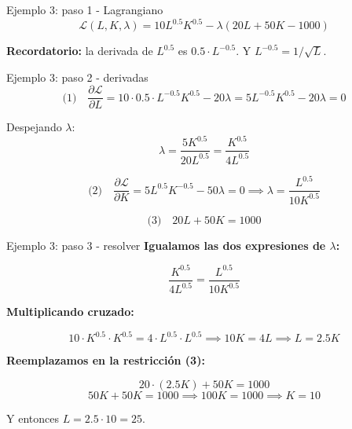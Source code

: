 \documentclass{beamer}
\begin{document}
\begin{frame}{Ejemplo 3: paso 1 - Lagrangiano}
    \small
    \[
    \mathcal{L}(L, K, \lambda) = 10 L^{0.5} K^{0.5} - \lambda(20L + 50K - 1000)
    \]

    \vspace{1em}

    \textbf{Recordatorio:} la derivada de $L^{0.5}$ es $0.5 \cdot L^{-0.5}$. Y $L^{-0.5} = 1/\sqrt{L}$.
\end{frame}

\begin{frame}{Ejemplo 3: paso 2 - derivadas}
    \small
    \[
    \text{(1)} \quad \frac{\partial \mathcal{L}}{\partial L} = 10 \cdot 0.5 \cdot L^{-0.5} K^{0.5} - 20\lambda = 5 L^{-0.5} K^{0.5} - 20\lambda = 0
    \]

    \vspace{0.3em}

    Despejando $\lambda$:
    \[
    \lambda = \frac{5 K^{0.5}}{20 L^{0.5}} = \frac{K^{0.5}}{4 L^{0.5}}
    \]

    \vspace{0.8em}

    \[
    \text{(2)} \quad \frac{\partial \mathcal{L}}{\partial K} = 5 L^{0.5} K^{-0.5} - 50\lambda = 0 \implies \lambda = \frac{L^{0.5}}{10 K^{0.5}}
    \]

    \[
    \text{(3)} \quad 20L + 50K = 1000
    \]
\end{frame}

\begin{frame}{Ejemplo 3: paso 3 - resolver}
    \small
    \textbf{Igualamos las dos expresiones de $\lambda$:}

    \[
    \frac{K^{0.5}}{4 L^{0.5}} = \frac{L^{0.5}}{10 K^{0.5}}
    \]

    \vspace{0.3em}

    \textbf{Multiplicando cruzado:}

    \[
    10 \cdot K^{0.5} \cdot K^{0.5} = 4 \cdot L^{0.5} \cdot L^{0.5} \implies 10K = 4L \implies L = 2.5K
    \]

    \vspace{0.5em}

    \textbf{Reemplazamos en la restricción (3):}

    \[
    20 \cdot (2.5K) + 50K = 1000
    \]
    \[
    50K + 50K = 1000 \implies 100K = 1000 \implies K = 10
    \]

    \vspace{0.3em}

    Y entonces $L = 2.5 \cdot 10 = 25$.
\end{frame}
\end{document}
